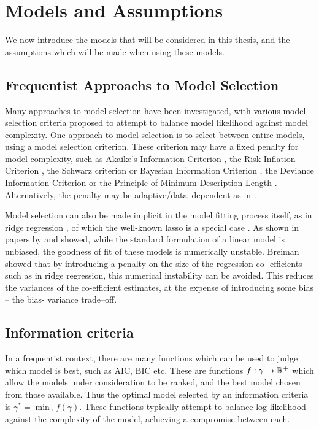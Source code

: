 \section{Models and Assumptions}

We now introduce the models that will be considered in this thesis, and the assumptions which will be made
when using these models.

\subsection{Frequentist Approachs to Model Selection}
Many approaches to model selection have been investigated, with various model selection criteria proposed to
attempt to balance model likelihood against model complexity. One approach to model selection is to select
between entire models, using a model selection criterion. These criterion may have a fixed penalty for model
complexity, such as Akaike's Information Criterion \cite{Akaike1974}, the Risk Inflation Criterion
\cite{Foster1994}, the Schwarz criterion or Bayesian Information Criterion \cite{Schwarz1978}, the Deviance
Information Criterion \cite{Spiegelhalter2016} or the Principle of Minimum Description Length
\cite{Hansen2001}. Alternatively, the penalty may be adaptive/data--dependent as in \cite{George2000}.

Model selection can also be made implicit in the model fitting process itself, as in ridge regression
\cite{Casella1980}, of which the well-known lasso is a special case \cite{Tibshirani1996}. As shown in
papers by \cite{Breiman1996} and \cite{Efron2013} showed, while  the standard formulation of a linear model
is unbiased, the goodness of fit of these models is numerically  unstable. Breiman showed that by introducing
a penalty on the size of the regression co- efficients such as  in ridge regression, this numerical
instability can be avoided. This reduces the variances of the co-efficient estimates, at the expense of
introducing some bias -- the bias- variance trade--off.

\subsection{Information criteria}
In a frequentist context, there are many functions which can be used to judge which model is best, such as
AIC, BIC etc. These are functions $f: \gamma \to {\mathbb{R}}^+$ which allow the models under consideration to be
ranked, and the best model chosen from those available. Thus the optimal model selected by an information
criteria is $\gamma^* = \min_\gamma f(\gamma)$. These functions typically attempt to balance log likelihood
against the complexity of the model, achieving a compromise between each.

